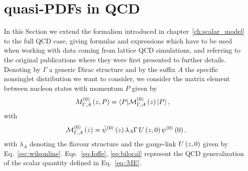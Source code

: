 \section{quasi-PDFs in QCD}
\label{sec:qPDFs_th}
%
In this Section we extend the formalism introduced in chapter~\ref{ch:scalar_model} to the full QCD case,
giving formulas and expressions which have to be used when working with data coming from lattice QCD simulations,
and referring to the original publications where they were first presented to further details.
Denoting by $\Gamma$ a generic Dirac structure and by the suffix $A$ the specific nonsinglet distribution
we want to consider, we consider the matrix element between nucleon states with momentum $P$ given by
\begin{align}
	\label{eq:Ioffe}
	M^{(0)}_{\Gamma,A}\left(z,P\right) &= \langle P |\mathcal{M}^{(0)}_{\Gamma,A}\left(z\right) |P\rangle \, ,
\end{align}
with
\begin{align}
	\label{eq:bilocal}
	\mathcal{M}^{(0)}_{\Gamma,A}\left(z\right)= \bar{\psi}^{(0)}\left( z\right) \lambda_A \Gamma \,   
	U\left( z,0\right) \psi^{(0)}\left( 0\right).
\end{align}
with $\lambda_A$ denoting the flavour structure and the gauge-link $U\left( z,0\right)$ given by Eq.~\eqref{eq::wilsonline}.
Eqs.~\eqref{eq:Ioffe}, \eqref{eq:bilocal} represent the QCD generalization of the scalar quantity defined 
in Eq.~\eqref{eq::ME}.

